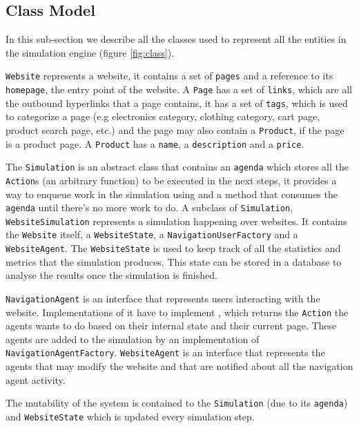\subsection{Class Model}

In this sub-section we describe all the classes used to represent all the 
entities in the simulation engine (figure \ref{fig:class}).

\texttt{Website} represents a website, it contains a set of \texttt{pages} and 
a reference to its \texttt{homepage}, the entry point of the website. A 
\texttt{Page} has a set of \texttt{links}, which are all the outbound 
hyperlinks that a page contains, it has a set of \texttt{tags}, which is used 
to categorize a page (e.g electronics category, clothing category, cart page, 
product search page, etc.) and the page may also contain a \texttt{Product}, if 
the page is a product page. A \texttt{Product} has a \texttt{name}, a 
\texttt{description} and a \texttt{price}.

The \texttt{Simulation} is an abstract class that contains an \texttt{agenda} 
which stores all the \texttt{Action}s (an arbitrary function) to be executed in 
the next steps, it provides a way to enqueue work in the simulation using 
 and a  method that consumes 
the \texttt{agenda} until there's no more work to do. A subclass of 
\texttt{Simulation}, \texttt{WebsiteSimulation} represents a simulation 
happening over websites. It contains the \texttt{Website} itself, a 
\texttt{WebsiteState}, a \texttt{NavigationUserFactory} and a 
\texttt{WebsiteAgent}. The \texttt{WebsiteState} is used to keep track of all 
the statistics and metrics that the simulation produces. This state can be 
stored in a database to analyse the results once the simulation is finished.

\texttt{NavigationAgent} is an interface that represents users interacting with 
the website. Implementations of it have to implement , 
which returns the \texttt{Action} the agents wants to do based on their 
internal state and their current page. These agents are added to the simulation 
by an implementation of \texttt{NavigationAgentFactory}. \texttt{WebsiteAgent} 
is an interface that represents the agents that may modify the website and that 
are notified about all the navigation agent activity.

The mutability of the system is contained to the \texttt{Simulation} (due to 
its \texttt{agenda}) and \texttt{WebsiteState} which is updated every 
simulation step.

